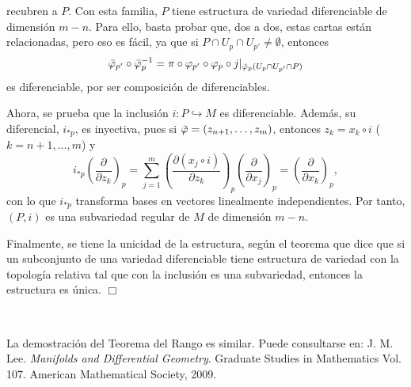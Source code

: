 \documentclass[cursovd_portada.tex]{subfiles}
\begin{document}
recubren a $P$. Con esta familia, $P$ tiene estructura de variedad diferenciable de dimensión $m-n$. Para ello,
basta probar que, dos a dos, estas cartas están relacionadas, pero eso es fácil, ya que si $P\cap U_p\cap
U_{p'}\neq \emptyset$, entonces
$$\bar{\varphi}_{p'}\circ{\bar{\varphi}_p}^{-1}=\pi\circ\varphi_{p'}\circ\varphi_p\circ j|_
{\bar{\varphi}_p(U_p\cap U_{p'}\cap P)}$$ es diferenciable, por ser composición de diferenciables.
\par
Ahora, se prueba que la inclusión $i:P\hookrightarrow M$ es diferenciable. Además, su diferencial, $i_{*p}$, es
inyectiva, pues si $\bar{\varphi}=(z_{n+1}, \dots ,z_m)$, entonces $z_k=x_k\circ i$ ($k=n+1,\dots ,m$) y
$$i_{*p}\left(\frac{\partial}{\partial z_k}\right)_p=\sum_{j=1}^m\left(\frac{\partial
(x_j\circ i)}{\partial z_k}\right)_p\left(\frac{\partial}{\partial x_j}\right)_p=\left(\frac{
\partial}{\partial x_k}\right)_p,$$
con lo que $i_{*p}$ transforma bases en vectores linealmente independientes. Por tanto, $(P,i)$ es una subvariedad
regular de $M$ de dimensión $m-n$.
\par
Finalmente, se tiene la unicidad de la estructura, según el teorema que dice que si un subconjunto de una variedad
diferenciable tiene estructura de variedad con la topología relativa tal que con la inclusión es una subvariedad,
entonces la estructura es única. \hfill $\Box$

\

La demostración del Teorema del Rango es similar. Puede
consultarse en: J. M. Lee. {\it Manifolds and Differential
Geometry}. Graduate Studies in Mathematics Vol. 107. American
Mathematical Society, 2009.
\end{document}
